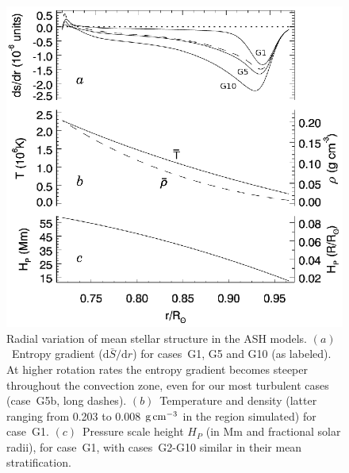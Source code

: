  
\begin{figure}[htbp]
  \begin{center}
    \includegraphics[width=0.75\linewidth]{figs/chapter_2/Figure_1.eps}
  \end{center}
  \caption[Radial variation of mean stellar structure in the ASH models]
          {Radial variation of mean stellar structure in the ASH models.  
  $(a)$~Entropy gradient ($\mathrm{d}\bar{S}/\mathrm{d}r$) for cases~G1, G5
  and G10 (as labeled).  At higher rotation rates the entropy gradient
  becomes steeper throughout the convection zone, even for our most
  turbulent cases (case~G5b, long dashes).  $(b)$~Temperature and
  density (latter ranging from 0.203 to 0.008 $\mathrm{g}\thinspace
  \mathrm{cm}^{-3}$ in the region simulated) for case~G1.  
  $(c)$~Pressure scale height $H_P$ (in Mm and fractional solar radii), for
  case~G1, with cases~G2-G10 similar in their mean stratification.
  \label{fig:ash_structure}}
\end{figure}
 


